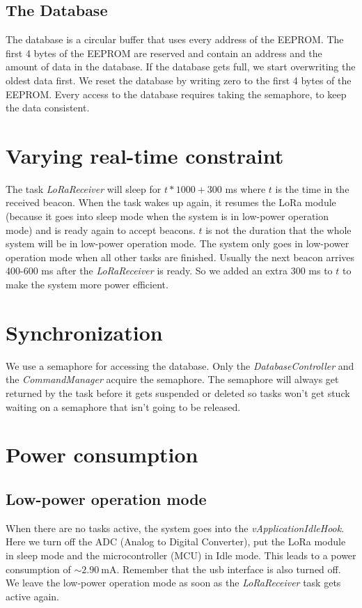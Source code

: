 \documentclass{scrartcl}
\begin{document}
\subsection{The Database}
The database is a circular buffer that uses every address of the EEPROM.
The first 4 bytes of the EEPROM are reserved and contain an address and the amount of data in the database.
If the database gets full, we start overwriting the oldest data first.
We reset the database by writing zero to the first 4 bytes of the EEPROM.
Every access to the database requires taking the semaphore, to keep the data consistent.

\section{Varying real-time constraint}
The task \textit{LoRaReceiver} will sleep for $t*1000 + 300$ \si{\milli\second} where $t$ is the time in the received beacon.
When the task wakes up again, it resumes the LoRa module (because it goes into sleep mode when the system is in low-power operation mode)
and is ready again to accept beacons. $t$ is not the duration that the whole system will be in low-power operation mode.
The system only goes in low-power operation mode when all other tasks are finished.
Usually the next beacon arrives 400-600 \si{\milli\second} after the \textit{LoRaReceiver} is ready.
So we added an extra 300 \si{\milli\second} to $t$ to make the system more power efficient.

\newpage

\section{Synchronization}
We use a semaphore for accessing the database. Only the \textit{DatabaseController} and the \textit{CommandManager} acquire the semaphore.
The semaphore will always get returned by the task before it gets suspended or deleted so tasks won't get stuck waiting on a semaphore
that isn't going to be released.

\section{Power consumption}
\subsection{Low-power operation mode}
When there are no tasks active, the system goes into the \textit{vApplicationIdleHook}.
Here we turn off the ADC (Analog to Digital Converter),
put the LoRa module in sleep mode and the microcontroller (MCU) in Idle mode.
This leads to a power consumption of $\sim \SI{2.90}{\milli\ampere}$.
Remember that the usb interface is also turned off.
We leave the low-power operation mode as soon as the \textit{LoRaReceiver} task gets active again.
\end{document}

